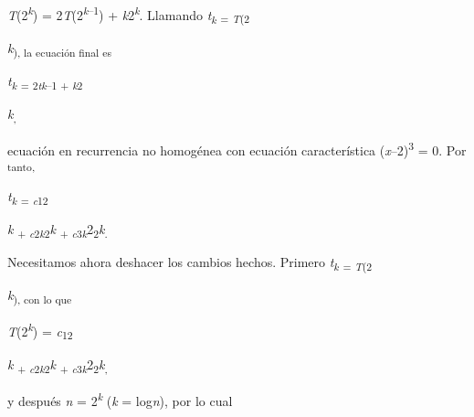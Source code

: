 \documentclass[12pt]{article}
\renewcommand{\_}{\kern-1.5pt\textunderscore\kern-1.5pt}
\begin{document}
\begin{adjustwidth}{0.58in}{2.46in}
{\fontsize{10pt}{12.0pt}\selectfont \textit{T}(2\textit{\textsuperscript{k}}) = 2\textit{T}(2\textit{\textsuperscript{k}}\textsuperscript{–1}) + \textit{k}2\textit{\textsuperscript{k}}. Llamando \textit{t\textsubscript{k }}\textsubscript{= \textit{T}(2}{\fontsize{7pt}{8.4pt}\selectfont \textit{k}\textsubscript{), la ecuación final es }\par}\par}\par

\end{adjustwidth}

\begin{adjustwidth}{0.58in}{0.57in}
\begin{Center}
{\fontsize{10pt}{12.0pt}\selectfont \textit{t\textsubscript{k }}\textsubscript{= 2\textit{tk}–1 + \textit{k}2}{\fontsize{7pt}{8.4pt}\selectfont \textit{k}\textsubscript{, }{\fontsize{10pt}{12.0pt}\selectfont ecuación en recurrencia no homogénea con ecuación característica (\textit{x}–2)\textsuperscript{3 }= 0. Por \textsubscript{tanto, }\par}\par}\par}
\end{Center}\par

\end{adjustwidth}

\begin{adjustwidth}{0.58in}{0.88in}
\begin{Center}
{\fontsize{10pt}{12.0pt}\selectfont \textit{t\textsubscript{k }}\textsubscript{= \textit{c}12}{\fontsize{7pt}{8.4pt}\selectfont \textit{k }\textsubscript{+ \textit{c}2\textit{k}2}\textit{k }\textsubscript{+ \textit{c}3\textit{k}}2\textsubscript{2}\textit{k}\textsubscript{. }{\fontsize{10pt}{12.0pt}\selectfont Necesitamos ahora deshacer los cambios hechos. Primero \textit{t\textsubscript{k }}\textsubscript{= \textit{T}(2}{\fontsize{7pt}{8.4pt}\selectfont \textit{k}\textsubscript{), con lo que }\par}\par}\par}\par}
\end{Center}\par

\end{adjustwidth}

\begin{adjustwidth}{0.58in}{2.27in}
{\fontsize{10pt}{12.0pt}\selectfont \textit{T}(2\textit{\textsuperscript{k}}) = \textit{c}\textsubscript{12}{\fontsize{7pt}{8.4pt}\selectfont \textit{k }\textsubscript{+ \textit{c}2\textit{k}2}\textit{k }\textsubscript{+ \textit{c}3\textit{k}}2\textsubscript{2}\textit{k}\textsubscript{, }{\fontsize{10pt}{12.0pt}\selectfont y después \textit{n }= 2\textit{\textsuperscript{k }}(\textit{k }= log\textit{n}), por lo cual \par}\par}\par}\par

\end{adjustwidth}
\end{document}
